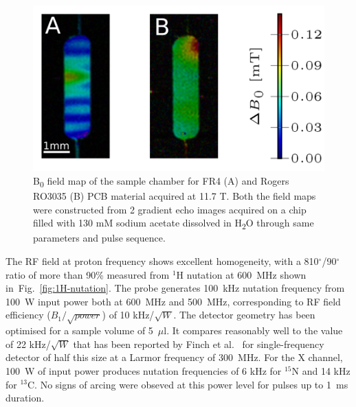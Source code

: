 \documentclass[preprint,5p]{elsarticle}
\newcommand{\fig}[1]{Fig.~\ref{#1}}
\begin{document}
\cbstart
\begin{figure} \centering
\includegraphics[width=\linewidth,keepaspectratio=true]{./figures/pcb-fieldmap-colorbar.png}
\caption{B\textsubscript{0} field map of the sample chamber for FR4 (A) and
Rogers RO3035 (B) PCB material acquired at 11.7 T. Both the field maps were constructed from 2
gradient echo images acquired on a chip filled with 130 mM sodium acetate
dissolved in H\textsubscript{2}O through same parameters and pulse sequence.}
\label{fig:field map}
\end{figure}
\cbend
\cbdelete
The RF field at proton frequency shows excellent homogeneity, with a
810$^{\circ}$/90$^{\circ}$ ratio of more than 90\% measured from $^1$H nutation at 600~MHz shown in~\fig{fig:1H-nutation}. The
probe generates 100~kHz nutation frequency from 100~W input power both at
600~MHz and 500~MHz, corresponding to RF field efficiency ($B_{1}/\sqrt{power}$)
of 10 kHz/$\sqrt{W}$. The detector geometry has been optimised for a sample
volume of 5~$\mu$l. It compares reasonably well to the value of 22
kHz/$\sqrt{W}$ that has been reported by Finch et al.~\cite{gream_2016} for
single-frequency detector of half this size at a Larmor frequency of 300~MHz.
For the X channel, 100~W of input power produces nutation frequencies of 6 kHz for
$^{15}$N and 14 kHz for $^{13}$C. No signs of arcing were obseved at this power
level for pulses up to 1~ms duration.
\end{document}
